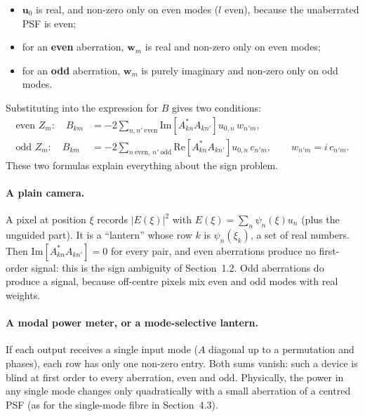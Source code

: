 \documentclass[11pt,a4paper]{article}
\newcommand{\uvec}{\mathbf{u}}
\begin{document}
\begin{itemize}
\item $\uvec_0$ is real, and non-zero only on even modes ($l$ even), because the unaberrated PSF is even;
\item for an \textbf{even} aberration, $\mathbf{w}_m$ is real and non-zero only on even modes;
\item for an \textbf{odd} aberration, $\mathbf{w}_m$ is purely imaginary and non-zero only on odd modes.
\end{itemize}
Substituting into the expression for $B$ gives two conditions:
\begin{align}
\text{even } Z_m:\quad
B_{km} &= -2 \sum_{n,n'\ \mathrm{even}} \mathrm{Im}\!\left[ A_{kn}^* A_{kn'} \right] u_{0,n}\, w_{n'm},
\label{eq:B_even}\\
\text{odd } Z_m:\quad
B_{km} &= -2 \sum_{n\ \mathrm{even},\, n'\ \mathrm{odd}} \mathrm{Re}\!\left[ A_{kn}^* A_{kn'} \right] u_{0,n}\, c_{n'm},
\qquad w_{n'm} = i\, c_{n'm}.
\label{eq:B_odd}
\end{align}
These two formulas explain everything about the sign problem.

\paragraph{A plain camera.} A pixel at position $\xi$ records $|E(\xi)|^2$ with $E(\xi) = \sum_n \psi_n(\xi) u_n$ (plus the unguided part). It is a ``lantern'' whose row $k$ is $\psi_n(\xi_k)$, a set of real numbers. Then $\mathrm{Im}[A_{kn}^* A_{kn'}] = 0$ for every pair, and even aberrations produce no first-order signal: this is the sign ambiguity of Section~1.2. Odd aberrations do produce a signal, because off-centre pixels mix even and odd modes with real weights.

\paragraph{A modal power meter, or a mode-selective lantern.} If each output receives a single input mode ($A$ diagonal up to a permutation and phases), each row has only one non-zero entry. Both sums vanish: such a device is blind at first order to every aberration, even and odd. Physically, the power in any single mode changes only quadratically with a small aberration of a centred PSF (as for the single-mode fibre in Section~4.3).
\end{document}
